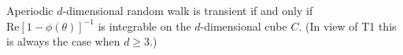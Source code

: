 Aperiodic $d$-dimensional random walk is transient if and only if $\text{Re}[1 - \phi(\theta)]^{-1}$ is integrable on the $d$-dimensional cube $C$. (In view of T1 this is always the case when $d \geq 3$.)